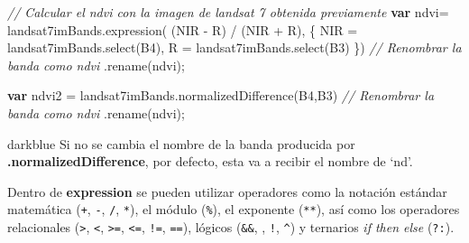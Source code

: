 \documentclass[
  12pt,
  letterpaper,
  twoside]{book}
\newenvironment{Shaded}{\begin{snugshade}}{\end{snugshade}}
\newcommand{\CommentTok}[1]{\textcolor[rgb]{0.24,0.58,0.00}{\textit{#1}}}
\newcommand{\ControlFlowTok}[1]{\textcolor[rgb]{0.00,0.00,0.00}{\textbf{#1}}}
\newcommand{\FunctionTok}[1]{\textcolor[rgb]{0.48,0.12,0.64}{#1}}
\newcommand{\NormalTok}[1]{#1}
\newcommand{\OperatorTok}[1]{\textcolor[rgb]{0.00,0.00,0.00}{#1}}
\newcommand{\StringTok}[1]{\textcolor[rgb]{0.87,0.29,0.22}{#1}}
\newcommand\boldpurple[1]{\textcolor{darkpurple}{\textbf{#1}}}
\begin{document}
\begin{Shaded}
\begin{Highlighting}[]
\CommentTok{// Calcular el ndvi con la imagen de landsat 7 obtenida previamente}
\ControlFlowTok{var}\NormalTok{ ndvi}\OperatorTok{=}\NormalTok{ landsat7imBands}\OperatorTok{.}\FunctionTok{expression}\NormalTok{( }\StringTok{\textquotesingle{}(NIR {-} R) / (NIR + R)\textquotesingle{}}\OperatorTok{,}\NormalTok{ \{}
  \StringTok{\textquotesingle{}NIR\textquotesingle{}} \OperatorTok{=}\NormalTok{ landsat7imBands}\OperatorTok{.}\FunctionTok{select}\NormalTok{(}\StringTok{\textquotesingle{}B4\textquotesingle{}}\NormalTok{)}\OperatorTok{,}
  \StringTok{\textquotesingle{}R\textquotesingle{}} \OperatorTok{=}\NormalTok{ landsat7imBands}\OperatorTok{.}\FunctionTok{select}\NormalTok{(}\StringTok{\textquotesingle{}B3\textquotesingle{}}\NormalTok{)}
\NormalTok{\})}
  \CommentTok{// Renombrar la banda como \textquotesingle{}ndvi\textquotesingle{}}
  \OperatorTok{.}\FunctionTok{rename}\NormalTok{(}\StringTok{\textquotesingle{}ndvi\textquotesingle{}}\NormalTok{)}\OperatorTok{;}
  
\ControlFlowTok{var}\NormalTok{ ndvi2 }\OperatorTok{=}\NormalTok{ landsat7imBands}\OperatorTok{.}\FunctionTok{normalizedDifference}\NormalTok{(}\StringTok{\textquotesingle{}B4\textquotesingle{}}\OperatorTok{,}\StringTok{\textquotesingle{}B3\textquotesingle{}}\NormalTok{)}
  \CommentTok{// Renombrar la banda como \textquotesingle{}ndvi\textquotesingle{}}
  \OperatorTok{.}\FunctionTok{rename}\NormalTok{(}\StringTok{\textquotesingle{}ndvi\textquotesingle{}}\NormalTok{)}\OperatorTok{;}
\end{Highlighting}
\end{Shaded}

\begin{bluebox2}

\begin{awesomeblock}{5pt}{\faLightbulb}{darkblue}
Si no se cambia el nombre de la banda producida por \boldpurple{.normalizedDifference}, por defecto, esta va a recibir el nombre de `nd'.

\end{awesomeblock}

\end{bluebox2}

Dentro de \boldpurple{expression} se pueden utilizar operadores como la notación estándar matemática (\texttt{+}, \texttt{-}, \texttt{/}, \texttt{*}), el módulo (\texttt{\%}), el exponente (\texttt{**}), así como los operadores relacionales (\texttt{\textgreater{}}, \texttt{\textless{}}, \texttt{\textgreater{}=}, \texttt{\textless{}=}, \texttt{!=}, \texttt{==}), lógicos (\texttt{\&\&}, \texttt{\textbar{}\textbar{}}, \texttt{!}, \texttt{\^{}}) y ternarios \emph{if then else} (\texttt{?:}).
\end{document}
